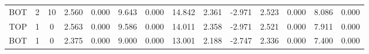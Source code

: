 \begin{landscape}
\begin{table}
\begin{tabular}{|ccc|ccccc|cc|cccc|}
BOT &  2 &  10 &   2.560 &   0.000 &   9.643 &   0.000 & 14.842 & 2.361 & -2.971 &    2.523 &    0.000 &    8.086 &    0.000 \\
TOP &  1 &   0 &   2.563 &   0.000 &   9.586 &   0.000 & 14.011 & 2.358 & -2.971 &    2.521 &    0.000 &    7.911 &    0.000 \\
BOT &  1 &   0 &   2.375 &   0.000 &   9.000 &   0.000 & 13.001 & 2.188 & -2.747 &    2.336 &    0.000 &    7.400 &    0.000 \\
\bottomrule
\end{tabular}
\end{table}
\end{landscape}